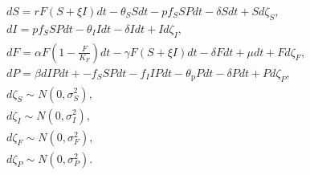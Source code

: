 \documentclass[12pt]{article}
\begin{document}
{
\small
\begin{align}
&d S = r F\left(S+\xi I\right)dt - \theta_{S}S dt - p f_{S} S Pdt - \delta Sdt + S d\zeta_{S},\\
&d I = p f_{S} S Pdt - \theta_{I} Idt - \delta Idt + I d\zeta_{I},\\
&dF = \alpha F\left(1-\frac{F}{K_F}\right)dt - \gamma F \left(S+\xi I\right) dt - \delta F dt + \mu dt + F d\zeta_F,\\
&d P = \beta d IPdt +  - f_{S} S Pdt - f_{I} I Pdt - \theta_{\mathrm{p}} Pdt - \delta P dt + P d\zeta_{P},\\
&d\zeta_{S} \sim N\left(0, \sigma_{S}^{2}\right),\\
&d\zeta_{I} \sim N\left(0, \sigma_{I}^{2}\right),\\
&d\zeta_{F} \sim N\left(0, \sigma_{F}^{2}\right),\\
&d\zeta_{P} \sim N\left(0, \sigma_{P}^{2}\right).
\end{align}
}
\end{document}
